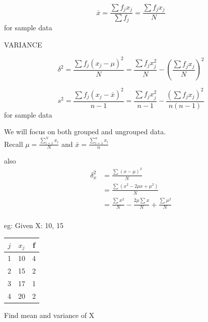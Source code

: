 \documentclass[12pt]{article}
\begin{document}
\begin{equation*}
    \bar{x} = \frac{\sum f_j x_j}{\sum f_j}  = \frac{\sum f_j x_j}{N}
\end{equation*}
for sample data


VARIANCE

\begin{equation*}
    \delta^2 = \frac{\sum f_j(x_j - \mu)^2}{N} = \frac{\sum f_j x_j^2}{N} - (\frac{\sum f_jx_j}{N})^2
\end{equation*}

\begin{equation*}
    s^2 = \frac{\sum f_j(x_j - \bar{x})^2}{n-1} = \frac{\sum f_j x_j^2}{n-1} - \frac{(\sum f_jx_j)^2}{n(n-1)}
\end{equation*}
for sample data



We will focus on both grouped and ungrouped data. \\
Recall $\mu = \frac{\sum_{i = 1}^{N}x_i}{N}$ and $\bar{x} = \frac{\sum_{i = 1}^{n}x_i}{n}$

also
\begin{align*}
    \delta_x^2 & = \frac{\sum_{}^{}(x - \mu)^2}{N}                                                 \\
               & = \frac{\sum_{}^{}(x^2 - 2\mu x + \mu^2)}{N}                                      \\
               & = \frac{\sum_{}^{}x^2}{N} - \frac{2\mu\sum_{}^{}x}{N} + \frac{\sum_{}^{}\mu^2}{N} \\
\end{align*}






eg: Given X: 10, 15
\begin{table}[H]
    \centering
    \begin{tabular}{|c|c|c|}
        \hline $j$ & $x_j$ & f \\
        \hline 1   & 10    & 4 \\
        \hline 2   & 15    & 2 \\
        \hline 3   & 17    & 1 \\
        \hline 4   & 20    & 2 \\
        \hline
    \end{tabular}
\end{table}

Find mean and variance of X
\end{document}
